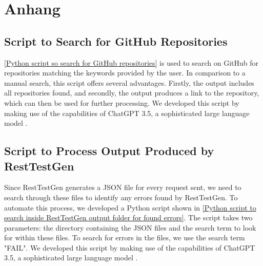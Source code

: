 \appendix
\section{Anhang}
\label{Code Appendix}

\subsection{Script to Search for GitHub Repositories}
\label{Script to search for GitHub repositories}
\autoref{Python script so search for GitHub repositories} is used to search on GitHub for repositories matching the keywords provided by the user.
In comparison to a manual search, this script offers several advantages.
Firstly, the output includes all repositories found, and secondly, the output produces a link to the repository, which can then be used for further processing.
We developed this script by making use of the capabilities of ChatGPT 3.5, a sophisticated large language model \cite{openai_chatgpt_2024}.



\newpage
\subsection{Script to Process Output Produced by RestTestGen}
\label{Script to process output produced by RestTestGen}
Since RestTestGen generates a \ac{JSON} file for every request sent, we need to search through these files to identify any errors found by RestTestGen.
To automate this process, we developed a Python script shown in \autoref{Python script to search inside RestTestGen output folder for found errors}.
The script takes two parameters: the directory containing the \ac{JSON} files and the search term to look for within these files.
To search for errors in the files, we use the search term "FAIL".
We developed this script by making use of the capabilities of ChatGPT 3.5, a sophisticated large language model \cite{openai_chatgpt_2024}.
